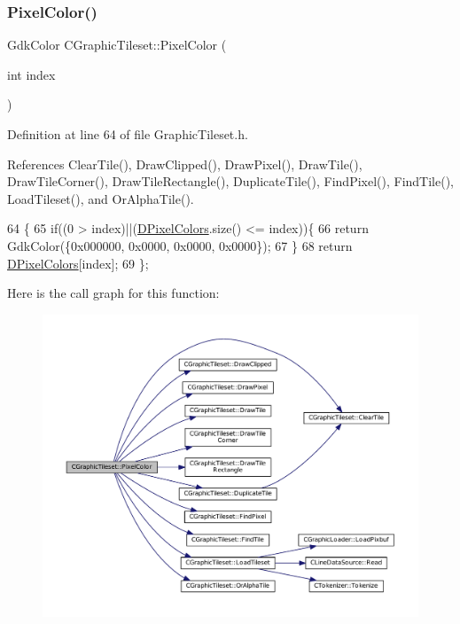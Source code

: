 \subsubsection{\texorpdfstring{Pixel\+Color()}{PixelColor()}}
{\footnotesize\ttfamily Gdk\+Color C\+Graphic\+Tileset\+::\+Pixel\+Color (\begin{DoxyParamCaption}\item[{int}]{index }\end{DoxyParamCaption})\hspace{0.3cm}{\ttfamily [inline]}}



Definition at line 64 of file Graphic\+Tileset.\+h.



References Clear\+Tile(), Draw\+Clipped(), Draw\+Pixel(), Draw\+Tile(), Draw\+Tile\+Corner(), Draw\+Tile\+Rectangle(), Duplicate\+Tile(), Find\+Pixel(), Find\+Tile(), Load\+Tileset(), and Or\+Alpha\+Tile().


\begin{DoxyCode}
64                                       \{
65             \textcolor{keywordflow}{if}((0 > index)||(\hyperlink{classCGraphicTileset_a4e9672b8b133dbac600fb8bb400d1cb3}{DPixelColors}.size() <= index))\{
66                 \textcolor{keywordflow}{return} GdkColor(\{0x000000, 0x0000, 0x0000, 0x0000\});
67             \}
68             \textcolor{keywordflow}{return} \hyperlink{classCGraphicTileset_a4e9672b8b133dbac600fb8bb400d1cb3}{DPixelColors}[index];
69         \};
\end{DoxyCode}
Here is the call graph for this function\+:\nopagebreak
\begin{figure}[H]
\begin{center}
\leavevmode
\includegraphics[width=350pt]{classCGraphicTileset_af278c60b01100c430bedfcedd9e9489f_cgraph}
\end{center}
\end{figure}
\hypertarget{classCGraphicTileset_af99f4b0ce58d25a5baaf836c74472910}{}\label{classCGraphicTileset_af99f4b0ce58d25a5baaf836c74472910} 
